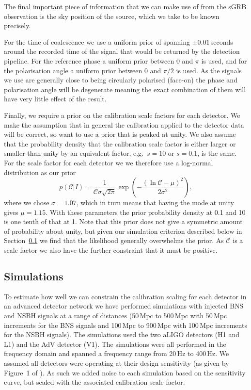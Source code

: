 \documentclass[10pt]{iopart}
\newcommand{\scf}{\ensuremath{\mathcal{C}}}
\begin{document}
The final important piece of information that we can make use of from the \ac{sGRB} observation is 
the sky position of the source, which we take to be known precisely.

For the time of coalescence we use a uniform prior of spanning $\pm0.01$\,seconds around the 
recorded time of the signal that would be returned by the detection pipeline. For the reference 
phase a uniform prior between 0 and $\pi$ is used, and for the polarisation angle a uniform prior 
between 0 and $\pi/2$ is used. As the signals we use are generally close to being circularly 
polarised (face-on) the phase and polarisation angle will be degenerate meaning the exact 
combination of them will have very little effect of the result.

Finally, we require a prior on the calibration scale factors for each detector. We make the 
assumption that in general the calibration applied to the detector data will be correct, so want to 
use a prior that is peaked at unity. We also assume that the probability density that the 
calibration scale factor is either larger or smaller than unity by an equivalent factor, e.g.\ 
$s=10$ or $s=0.1$, is the same. For the scale factor for each detector we we therefore use a 
log-normal distribution as our prior
\begin{equation}
 p(\scf|I) = \frac{1}{\scf\sigma\sqrt{2\pi}}\exp{\left( -\frac{(\ln{\scf} - \mu)^2}{2\sigma^2} 
\right)},
\end{equation}
where we chose $\sigma = 1.07$, which in turn means that having the mode at unity gives $\mu = 
1.15$. With these parameters the prior probability density at 0.1 and 10 is one tenth of that at 
1. Note that this prior does not give a symmetric amount of probability about unity, but given our 
simulation criterion described below in Section~\ref{sec:simulations} we find that the likelihood 
generally overwhelms the prior. As $\scf$ is a scale factor we also have the further constraint 
that it must be positive.

\subsection{Simulations}\label{sec:simulations}

To estimate how well we can constrain the calibration scaling for each detector in an advanced 
detector network we have performed simulations with injected \ac{BNS} and \ac{NSBH} signals at a 
range of distances (50\,Mpc to 500\,Mpc with 50\,Mpc increments for the \ac{BNS} signals and 
100\,Mpc to 900\,Mpc with 100\,Mpc increments for the \ac{NSBH} signals). The simulations used the 
two \ac{aLIGO} detectors (H1 and L1) and the \ac{AdV} detector (V1). The simulations were all 
performed in the frequency domain and spanned a frequency range from 20\,Hz to 400\,Hz. We assumed
all detectors were operating at their design sensitivity (as given by Figure~1 of 
\cite{2013arXiv1304.0670L}). As such we added noise to each simulation based on the sensitivity 
curve, but scaled with the associated calibration scale factor.
\end{document}
